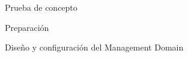 \begin{section}{Prueba de concepto}
\begin{subsection}{Preparación}
\end{subsection}
\begin{subsection}{Diseño y configuración del Management Domain}
    
    
    
    

\end{subsection}
\end{section}
